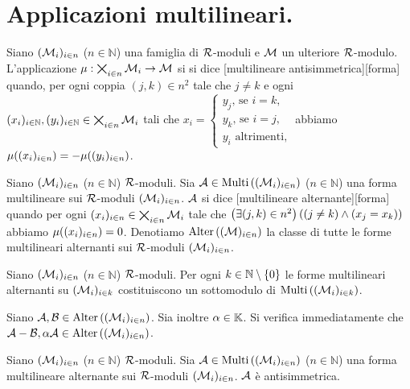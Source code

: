 \section{Applicazioni multilineari.}\label{ApplicazioniMultilineari}
\begin{Definition}
	Siano $(\mathcal{M}_i)_{i \in n}$ ($n \in \mathbb{N}$) una famiglia di $\mathcal{R}$-moduli e
	$\mathcal{M}$ un ulteriore $\mathcal{R}$-modulo. L'applicazione
	$\mu: \bigtimes_{i \in n} \mathcal{M}_i \rightarrow \mathcal{M}$ si si dice [multilineare antisimmetrica][forma] quando, per ogni coppia $(j,k) \in n^2$ tale che $j \neq k$ e ogni $(x_i)_{i \in \mathbb{N}}, (y_i)_{i \in \mathbb{N}} \in \bigtimes_{i \in n} \mathcal{M}_i$  tali che $x_i = \begin{cases} y_j\text{, se } i = k,\\ y_k\text{, se } i = j,\\ y_i\text{ altrimenti,}\end{cases}$ abbiamo $\mu((x_i)_{i \in n}) = - \mu((y_i)_{i \in n})$.
\end{Definition}
\begin{Definition}
	Siano $(\mathcal{M}_i)_{i \in n}$ ($n \in \mathbb{N}$) $\mathcal{R}$-moduli.
	Sia $\mathcal{A} \in \text{Multi}\left ( (\mathcal{M}_i)_{i \in n} \right )$ ($n \in \mathbb{N}$) una forma multilineare sui $\mathcal{R}$-moduli $(\mathcal{M}_i)_{i \in n}$. $\mathcal{A}$ si dice [multilineare alternante][forma] quando per ogni $(x_i)_{i \in n} \in \bigtimes_{i \in n} \mathcal{M}_i$ tale che $\left ( \exists (j,k) \in n^2 \right ) \left ( \left ( j \neq k \right ) \wedge \left ( x_j = x_k \right ) \right )$ abbiamo $\mu((x_i)_{i \in n}) = 0$. Denotiamo $\text{Alter} \left ( (\mathcal{M})_{i \in n} \right )$ la classe di tutte le forme multilineari alternanti sui $\mathcal{R}$-moduli $(\mathcal{M}_i)_{i \in n}$.
\end{Definition}
\begin{Theorem}
	Siano $(\mathcal{M}_i)_{i \in n}$ ($n \in \mathbb{N}$) $\mathcal{R}$-moduli. Per ogni $k \in \mathbb{N} \setminus \lbrace 0 \rbrace$ le forme multilineari alternanti su $(\mathcal{M}_i)_{i \in k}$ costituiscono un sottomodulo di $\text{Multi}\left ( (\mathcal{M}_i)_{i \in k} \right )$.
\end{Theorem}
\Proof Siano $\mathcal{A}, \mathcal{B} \in \text{Alter} \left ( (\mathcal{M}_i)_{i \in n} \right )$. Sia inoltre $\alpha \in \mathbb{K}$. Si verifica immediatamente che $\mathcal{A} - \mathcal{B}, \alpha\mathcal{A} \in \text{Alter} \left ( (\mathcal{M}_i)_{i \in n} \right )$. \EndProof
\begin{Theorem}
	Siano $(\mathcal{M}_i)_{i \in n}$ ($n \in \mathbb{N}$) $\mathcal{R}$-moduli.
	Sia $\mathcal{A} \in \text{Multi}\left ( (\mathcal{M}_i)_{i \in n} \right )$ ($n \in \mathbb{N}$) una forma multilineare alternante sui $\mathcal{R}$-moduli $(\mathcal{M}_i)_{i \in n}$. $\mathcal{A}$ \`e antisimmetrica.
\end{Theorem}
